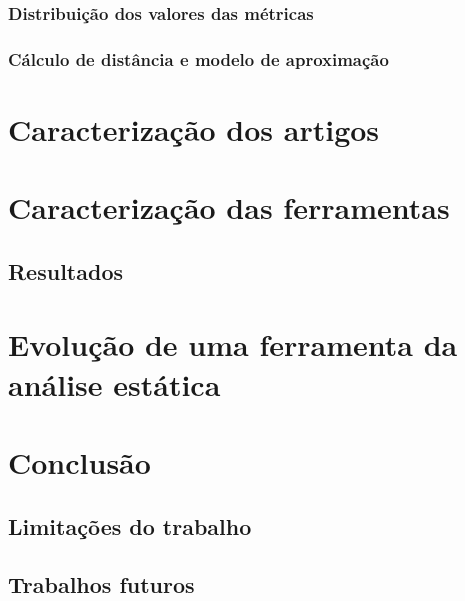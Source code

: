 \documentclass[qual, classic, a4paper]{ufbathesis}
\begin{document}
\subsection{Distribuição dos valores das métricas}

\subsection{Cálculo de distância e modelo de aproximação}

\chapter{Caracterização dos artigos}

\chapter{Caracterização das ferramentas}

\section{Resultados}

\chapter{Evolução de uma ferramenta da análise estática}

\chapter{Conclusão}

\section{Limitações do trabalho}

\section{Trabalhos futuros}

\backmatter

\appendix
\end{document}
